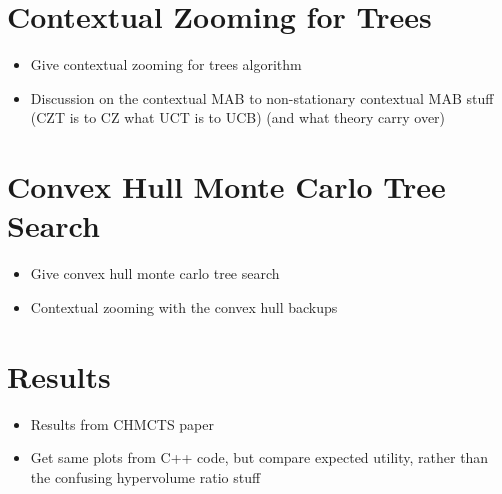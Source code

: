 \section{Contextual Zooming for Trees}
\label{sec:5-3-czt}

    \begin{itemize}
        \item Give contextual zooming for trees algorithm
        \item Discussion on the contextual MAB to non-stationary contextual MAB stuff (CZT is to CZ what UCT is to UCB) (and what theory carry over)
    \end{itemize}

\section{Convex Hull Monte Carlo Tree Search}
\label{sec:5-4-theory}

    \begin{itemize}
        \item Give convex hull monte carlo tree search
        \item Contextual zooming with the convex hull backups
    \end{itemize}


\section{Results}
\label{sec:5-5-results}

    \begin{itemize}
        \item Results from CHMCTS paper
        \item Get same plots from C++ code, but compare expected utility, rather than the confusing hypervolume ratio stuff
    \end{itemize}